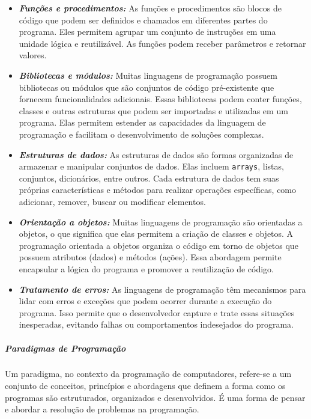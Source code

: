\documentclass[a4paper, 12pt, onecolumn,singlespacing]{article}
\begin{document}
\begin{itemize}
		\item \textbf{\textit{Funções e procedimentos:}} As funções e procedimentos são blocos de código que podem ser definidos e chamados em diferentes partes do programa. Eles permitem agrupar um conjunto de instruções em uma unidade lógica e reutilizável. As funções podem receber parâmetros e retornar valores.
		
		\item \textbf{\textit{Bibliotecas e módulos:}} Muitas linguagens de programação possuem bibliotecas ou módulos que são conjuntos de código pré-existente que fornecem funcionalidades adicionais. Essas bibliotecas podem conter funções, classes e outras estruturas que podem ser importadas e utilizadas em um programa. Elas permitem estender as capacidades da linguagem de programação e facilitam o desenvolvimento de soluções complexas.
		
		\item \textbf{\textit{Estruturas de dados:}} As estruturas de dados são formas organizadas de armazenar e manipular conjuntos de dados. Elas incluem \texttt{arrays}, listas, conjuntos, dicionários, entre outros. Cada estrutura de dados tem suas próprias características e métodos para realizar operações específicas, como adicionar, remover, buscar ou modificar elementos.
		
		\item \textbf{\textit{Orientação a objetos:}} Muitas linguagens de programação são orientadas a objetos, o que significa que elas permitem a criação de classes e objetos. A programação orientada a objetos organiza o código em torno de objetos que possuem atributos (dados) e métodos (ações). Essa abordagem permite encapsular a lógica do programa e promover a reutilização de código.
		
		\item \textbf{\textit{Tratamento de erros:}} As linguagens de programação têm mecanismos para lidar com erros e exceções que podem ocorrer durante a execução do programa. Isso permite que o desenvolvedor capture e trate essas situações inesperadas, evitando falhas ou comportamentos indesejados do programa.
		
	\end{itemize}
	
	\subparagraph{Paradigmas de Programação} \label{paradigmas_de_programacao} Um paradigma, no contexto da programação de computadores, refere-se a um conjunto de conceitos, princípios e abordagens que definem a forma como os programas são estruturados, organizados e desenvolvidos. É uma forma de pensar e abordar a resolução de problemas na programação.
	
\end{document}
